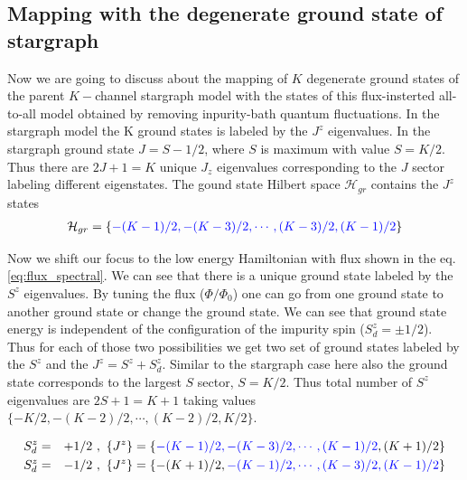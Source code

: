 \documentclass[reprint,prb,superscriptaddress]{revtex4-1}
\begin{document}
\subsection{Mapping with the degenerate ground state of stargraph}

\noindent Now we are going to discuss about the mapping of $K$ degenerate ground states of the parent $K-$channel stargraph model with the states of this flux-insterted all-to-all model obtained by removing inpurity-bath quantum fluctuations. In the stargraph model the K ground states is labeled by the $J^z$ eigenvalues. In the stargraph ground state $J=S-1/2$, where $S$ is maximum with value $S=K/2$. Thus there are $2J+1=K$ unique $J_z$ eigenvalues corresponding to the $J$ sector labeling different eigenstates. The gound state Hilbert space $\mathcal{H}_{gr}$ contains the $J^z$ states
\begin{eqnarray}
\mathcal{H}_{gr}=\{\textcolor{blue}{-(K-1)/2,-(K-3)/2,\cdots , (K-3)/2,(K-1)/2}\} \nonumber\\
\label{eq:stargraph_states}
\end{eqnarray}

\par Now we shift our focus to the low energy Hamiltonian with flux shown in the eq.\eqref{eq:flux_spectral}. We can see that there is a unique ground state labeled by the $S^z$ eigenvalues. By tuning the flux ($\Phi/\Phi_0$) one can go from one ground state to another ground state or change the ground state. We can see that ground state energy is independent of the configuration of the impurity spin ($S_d^z=\pm 1/2$). Thus for each of those two possibilities we get two set of ground states labeled by the $S^z$ and the $J^z=S^z+S^z_d$. Similar to the stargraph case here also the ground state corresponds to the largest $S$ sector, $S=K/2$. Thus total number of $S^z$ eigenvalues are $2S+1=K+1$ taking values $\{ -K/2, -(K-2)/2, \cdots, (K-2)/2, K/2 \}$.

\begin{widetext}
\begin{eqnarray}
S_d^z &=& +1/2~,~ \{J^z\}=\{ \textcolor{blue}{-(K-1)/2, -(K-3)/2, \cdots, (K-1)/2}, (K+1)/2\} \nonumber\\
S_d^z &=& -1/2~,~ \{J^z\}=\{-(K+1)/2,\textcolor{blue}{ -(K-1)/2, \cdots, (K-3)/2, (K-1)/2 } \}
\label{eq:all_to_all_states}
\end{eqnarray}
\end{widetext}
\end{document}
